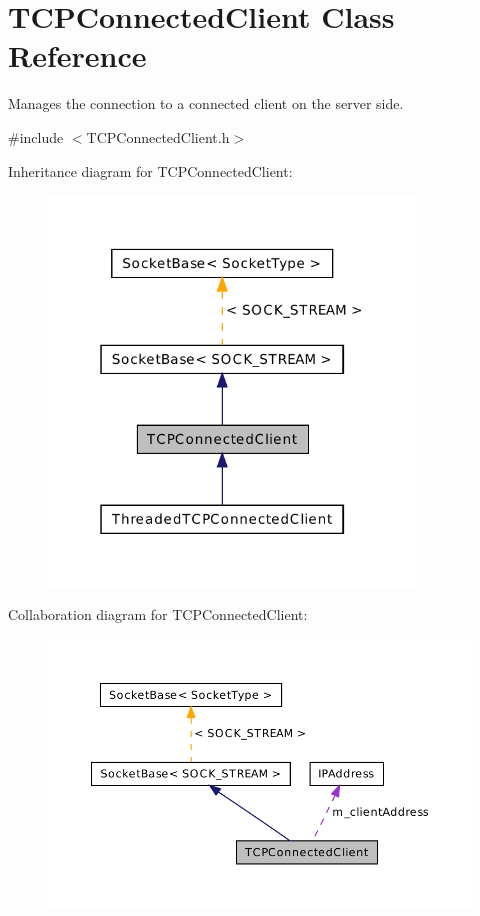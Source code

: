 \hypertarget{class_t_c_p_connected_client}{\section{T\-C\-P\-Connected\-Client Class Reference}
\label{class_t_c_p_connected_client}
}


Manages the connection to a connected client on the server side.  




{\ttfamily \#include $<$T\-C\-P\-Connected\-Client.\-h$>$}



Inheritance diagram for T\-C\-P\-Connected\-Client\-:\nopagebreak
\begin{figure}[H]
\begin{center}
\leavevmode
\includegraphics[width=277pt]{class_t_c_p_connected_client__inherit__graph}
\end{center}
\end{figure}


Collaboration diagram for T\-C\-P\-Connected\-Client\-:\nopagebreak
\begin{figure}[H]
\begin{center}
\leavevmode
\includegraphics[width=350pt]{class_t_c_p_connected_client__coll__graph}
\end{center}
\end{figure}
